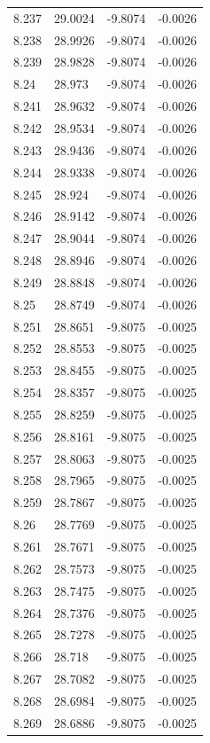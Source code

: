 \begin{tabular}{llll}
8.237 & 29.0024 & -9.8074 & -0.0026 \\
8.238 & 28.9926 & -9.8074 & -0.0026 \\
8.239 & 28.9828 & -9.8074 & -0.0026 \\
8.24 & 28.973 & -9.8074 & -0.0026 \\
8.241 & 28.9632 & -9.8074 & -0.0026 \\
8.242 & 28.9534 & -9.8074 & -0.0026 \\
8.243 & 28.9436 & -9.8074 & -0.0026 \\
8.244 & 28.9338 & -9.8074 & -0.0026 \\
8.245 & 28.924 & -9.8074 & -0.0026 \\
8.246 & 28.9142 & -9.8074 & -0.0026 \\
8.247 & 28.9044 & -9.8074 & -0.0026 \\
8.248 & 28.8946 & -9.8074 & -0.0026 \\
8.249 & 28.8848 & -9.8074 & -0.0026 \\
8.25 & 28.8749 & -9.8074 & -0.0026 \\
8.251 & 28.8651 & -9.8075 & -0.0025 \\
8.252 & 28.8553 & -9.8075 & -0.0025 \\
8.253 & 28.8455 & -9.8075 & -0.0025 \\
8.254 & 28.8357 & -9.8075 & -0.0025 \\
8.255 & 28.8259 & -9.8075 & -0.0025 \\
8.256 & 28.8161 & -9.8075 & -0.0025 \\
8.257 & 28.8063 & -9.8075 & -0.0025 \\
8.258 & 28.7965 & -9.8075 & -0.0025 \\
8.259 & 28.7867 & -9.8075 & -0.0025 \\
8.26 & 28.7769 & -9.8075 & -0.0025 \\
8.261 & 28.7671 & -9.8075 & -0.0025 \\
8.262 & 28.7573 & -9.8075 & -0.0025 \\
8.263 & 28.7475 & -9.8075 & -0.0025 \\
8.264 & 28.7376 & -9.8075 & -0.0025 \\
8.265 & 28.7278 & -9.8075 & -0.0025 \\
8.266 & 28.718 & -9.8075 & -0.0025 \\
8.267 & 28.7082 & -9.8075 & -0.0025 \\
8.268 & 28.6984 & -9.8075 & -0.0025 \\
8.269 & 28.6886 & -9.8075 & -0.0025 \\

\end{tabular}
